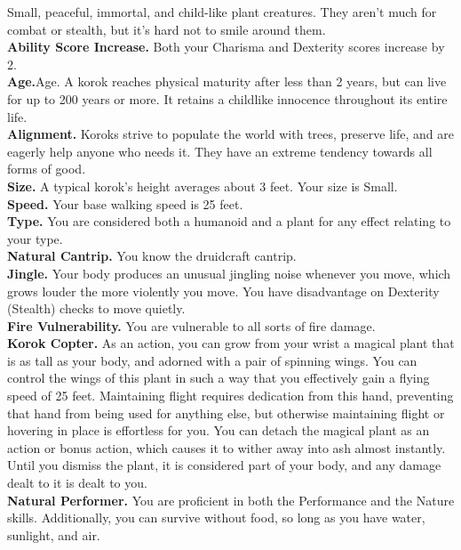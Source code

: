 \documentclass[10pt,twoside,twocolumn,openany]{book}
\begin{document}
Small, peaceful, immortal, and child-like plant creatures. They aren't much for combat or stealth, but it's hard not to smile around them.\\
\indent \textbf{Ability Score Increase.} Both your Charisma and Dexterity scores increase by 2.\\
\indent \textbf{Age.}Age. A korok reaches physical maturity after less than 2 years, but can live for up to 200 years or more. It retains a childlike innocence throughout its entire life.\\
\indent \textbf{Alignment.} Koroks strive to populate the world with trees, preserve life, and are eagerly help anyone who needs it. They have an extreme tendency towards all forms of good.\\
\indent \textbf{Size.} A typical korok’s height averages about 3 feet. Your size is Small.\\
\indent \textbf{Speed.} Your base walking speed is 25 feet.\\
\indent \textbf{Type.} You are considered both a humanoid and a plant for any effect relating to your type.\\
\indent \textbf{Natural Cantrip.} You know the druidcraft cantrip.\\
\indent \textbf{Jingle.} Your body produces an unusual jingling noise whenever you move, which grows louder the more violently you move. You have disadvantage on Dexterity (Stealth) checks to move quietly.\\
\indent \textbf{Fire Vulnerability.} You are vulnerable to all sorts of fire damage. \\
\indent \textbf{Korok Copter.} As an action, you can grow from your wrist a magical plant that is as tall as your body, and adorned with a pair of spinning wings. You can control the wings of this plant in such a way that you effectively gain a flying speed of 25 feet. Maintaining flight requires dedication from this hand, preventing that hand from being used for anything else, but otherwise maintaining flight or hovering in place is effortless for you. You can detach the magical plant as an action or bonus action, which causes it to wither away into ash almost instantly. Until you dismiss the plant, it is considered part of your body, and any damage dealt to it is dealt to you.\\
\indent \textbf{Natural Performer.} You are proficient in both the Performance and the Nature skills. Additionally, you can survive without food, so long as you have water, sunlight, and air.\\
\end{document}
